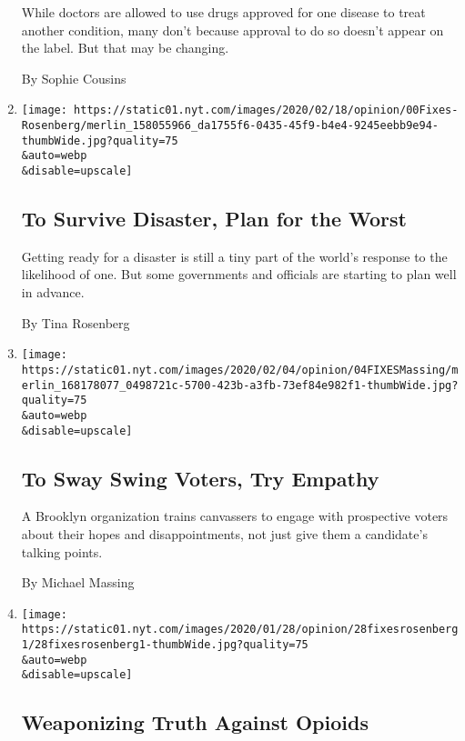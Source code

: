 \begin{enumerate}
  While doctors are allowed to use drugs approved for one disease to
  treat another condition, many don't because approval to do so doesn't
  appear on the label. But that may be changing.

  By Sophie Cousins
\item
  \href{/2020/02/19/opinion/survive-disaster-plan-for-worst.html}{}

  \texttt{[image: https://static01.nyt.com/images/2020/02/18/opinion/00Fixes-Rosenberg/merlin\_158055966\_da1755f6-0435-45f9-b4e4-9245eebb9e94-thumbWide.jpg?quality=75\\\&auto=webp\\\&disable=upscale]}

  \hypertarget{to-survive-disaster-plan-for-the-worst}{%
  \subsection{To Survive Disaster, Plan for the
  Worst}\label{to-survive-disaster-plan-for-the-worst}}

  Getting ready for a disaster is still a tiny part of the world's
  response to the likelihood of one. But some governments and officials
  are starting to plan well in advance.

  By Tina Rosenberg
\item
  \href{/2020/02/04/opinion/election-2020.html}{}

  \texttt{[image: https://static01.nyt.com/images/2020/02/04/opinion/04FIXESMassing/merlin\_168178077\_0498721c-5700-423b-a3fb-73ef84e982f1-thumbWide.jpg?quality=75\\\&auto=webp\\\&disable=upscale]}

  \hypertarget{to-sway-swing-voters-try-empathy}{%
  \subsection{To Sway Swing Voters, Try
  Empathy}\label{to-sway-swing-voters-try-empathy}}

  A Brooklyn organization trains canvassers to engage with prospective
  voters about their hopes and disappointments, not just give them a
  candidate's talking points.

  By Michael Massing
\item
  \href{/2020/01/28/opinion/opioid-drug-prevention-ads.html}{}

  \texttt{[image: https://static01.nyt.com/images/2020/01/28/opinion/28fixesrosenberg1/28fixesrosenberg1-thumbWide.jpg?quality=75\\\&auto=webp\\\&disable=upscale]}

  \hypertarget{weaponizing-truth-against-opioids}{%
  \subsection{Weaponizing Truth Against
  Opioids}\label{weaponizing-truth-against-opioids}}


\end{enumerate}

